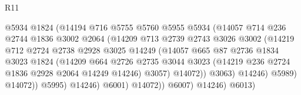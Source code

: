 \begin{lexlean}{R11}
\begin{coremodule}
                                    @5934
                                    @1824
                                    (@14194
                                      @716
                                      @5755
                                      @5760
                                      @5955
                                      @5934
                                      (@14057
                                        @714
                                        @236
                                        @2744
                                        @1836
                                        @3002
                                        @2064
                                        (@14209
                                          @713
                                          @2739
                                          @2743
                                          @3026
                                          @3002
                                          (@14219
                                            @712
                                            @2724
                                            @2738
                                            @2928
                                            @3025
                                            @14249
                                            (@14057
                                              @665
                                              @87
                                              @2736
                                              @1834
                                              @3023
                                              @1824
                                              (@14209
                                                @664
                                                @2726
                                                @2735
                                                @3044
                                                @3023
                                                (@14219 @236 @2724 @1836 @2928 @2064 @14249 @14246)
                                                @3057)
                                              @14072))
                                          @3063)
                                        @14246)
                                      @5989)
                                    @14072))
                                @5995)
                              @14246)
                            @6001)
                          @14072))
                      @6007)
                    @14246)
                  @6013)

\end{coremodule}
\end{lexlean}
